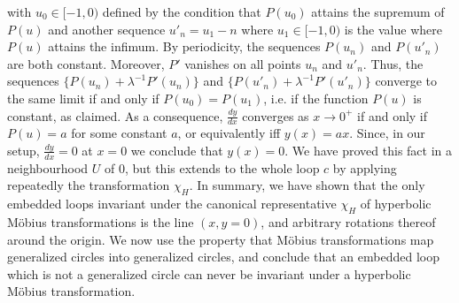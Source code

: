 with $u_0 \in [-1,0)$ defined by the condition that
$P(u_0)$ attains the supremum of $P(u)$
and another sequence  $u'_n = u_1 - n$ where
$u_1 \in [-1,0)$ is the value where $P(u)$ attains the infimum.
By periodicity, the sequences $P(u_n)$ and $P(u'_n)$ are both constant.
Moreover,  $P'$ vanishes on all points $u_n$ and $u'_n$.
Thus, the sequences $\{ P(u_n) + \lambda^{-1} P'(u_n) \}$
and $\{ P(u'_n) + \lambda^{-1} P'(u'_n) \}$
 converge to the same
limit if and only if $P(u_0) = P(u_1)$, i.e.  if the function $P(u)$
is constant, as claimed.
As a consequence, $\frac{dy}{dx}$ converges
as $x \rightarrow 0^+$ if and only if $P(u) = a$ for some constant $a$,
or equivalently iff $y(x) = ax$. Since,
in our setup, $\frac{dy}{dx}=0$ at $x=0$  we conclude that $y(x)=0$.
We have proved this fact in a neighbourhood $U$ of $0$,
but this extends to the whole loop $c$ by applying repeatedly the transformation
$\chi_H$. In summary, we have shown that the only  embedded
loops invariant under the canonical
representative $\chi_H$ of hyperbolic M\"obius transformations is
the line $(x, y=0)$, and arbitrary rotations thereof around
the origin. We now use the property that
M\"obius transformations map generalized circles 
into generalized circles, and conclude that 
an embedded loop which is not a generalized circle can never be invariant
under a hyperbolic M\"obius transformation.

